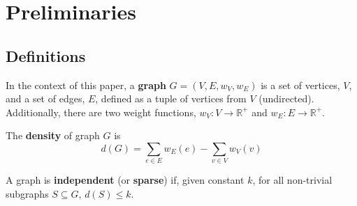 \section{Preliminaries}\label{prelim}

\subsection{Definitions}




\begin{definition}
   In the context of this paper, a \textbf{graph} $G=(V,E,w_V,w_E)$ is a set of vertices, $V$, and a set of edges, $E$, defined as a tuple of vertices from $V$ (undirected). Additionally, there are two weight functions, $w_V: V \to \mathbb{R}^+$ and $w_E: E \to \mathbb{R}^+$.
\end{definition}

\begin{definition}
    The \textbf{density} of graph $G$ is
    \begin{equation}
        d(G) = \sum_{e\in E}{w_E(e)} - \sum_{v\in V}{w_V(v)}
    \end{equation}
\end{definition}

\begin{definition}
    A graph is \textbf{independent} (or \textbf{sparse}) if, given constant $k$, for all non-trivial subgraphs $S\subseteq G$, $d(S) \leq k$.
\end{definition}


